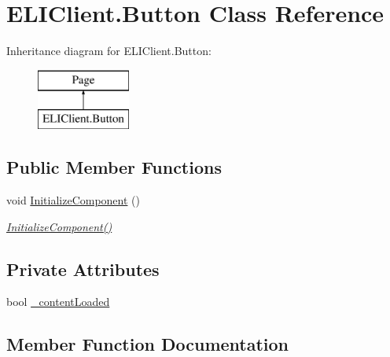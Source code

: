 \hypertarget{class_e_l_i_client_1_1_button}{}\section{E\+L\+I\+Client.\+Button Class Reference}
\label{class_e_l_i_client_1_1_button}
Inheritance diagram for E\+L\+I\+Client.\+Button\+:\begin{figure}[H]
\begin{center}
\leavevmode
\includegraphics[height=2.000000cm]{df/d7b/class_e_l_i_client_1_1_button}
\end{center}
\end{figure}
\subsection*{Public Member Functions}
\begin{DoxyCompactItemize}
\item 
void \hyperlink{class_e_l_i_client_1_1_button_a52a74c8b9cc2b93feb415c9ecf7e4cea}{Initialize\+Component} ()
\begin{DoxyCompactList}\small\item\em \hyperlink{class_e_l_i_client_1_1_button_a52a74c8b9cc2b93feb415c9ecf7e4cea}{Initialize\+Component()} \end{DoxyCompactList}\end{DoxyCompactItemize}
\subsection*{Private Attributes}
\begin{DoxyCompactItemize}
\item 
bool \hyperlink{class_e_l_i_client_1_1_button_aae4232a364beb631c420268cf49fc8a3}{\+\_\+content\+Loaded}
\end{DoxyCompactItemize}


\subsection{Member Function Documentation}
\mbox{\label{class_e_l_i_client_1_1_button_a52a74c8b9cc2b93feb415c9ecf7e4cea}} 
